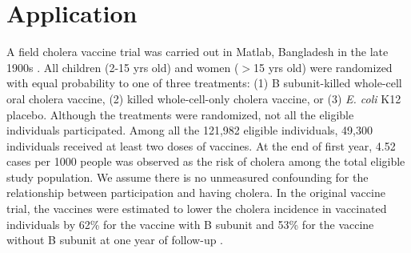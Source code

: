 \documentclass[oupdraft]{bio}
\begin{document}
%
%
%

\vspace{-0.4cm}
\section{Application}\label{sec: DR_dia}
A field cholera vaccine trial was carried out  in Matlab, Bangladesh in the late 1900s \citep{clemens1988field}. All children (2-15 yrs old) and women ($>$15 yrs old) were randomized with equal probability to one of three treatments: (1) B subunit-killed whole-cell oral cholera vaccine, (2) killed whole-cell-only cholera vaccine, or (3) {\it E. coli} K12 placebo. Although the treatments were randomized, not all the eligible individuals participated. Among all the 121,982 eligible individuals, 49,300 individuals received at least two doses of vaccines. At the end of first year, 4.52 cases per 1000 people was observed as the risk of cholera among the total eligible study population. We assume there is no unmeasured confounding for the relationship between participation and having cholera. In the original vaccine trial, the vaccines were estimated to lower the cholera incidence in vaccinated individuals by 62\% for the vaccine with B subunit and 53\% for the vaccine without B subunit at one year of follow-up \citep{clemens1988field}. 
\end{document}
